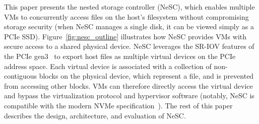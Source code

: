 This paper presents the nested storage controller (NeSC), which enables multiple VMs to concurrently access files on the host's filesystem without compromising storage security (when NeSC manages a single disk, it can be viewed simply as a PCIe SSD).
Figure~\ref{fig:nesc_outline} illustrates how NeSC provides VMs with secure access to a shared physical device.
NeSC leverages the SR-IOV features of the PCIe gen3~\cite{pcisigiov} to export host files as multiple virtual devices on the PCIe address space. Each virtual device is associated with a collection of non-contiguous blocks on the physical device, which represent a file, and is prevented from accessing other blocks. VMs can therefore directly access the virtual device and bypass the virtualization protocol and hypervisor software (notably, NeSC is compatible with the modern NVMe specification~\cite{nvme}).
The rest of this paper describes the design, architecture, and evaluation of NeSC.












